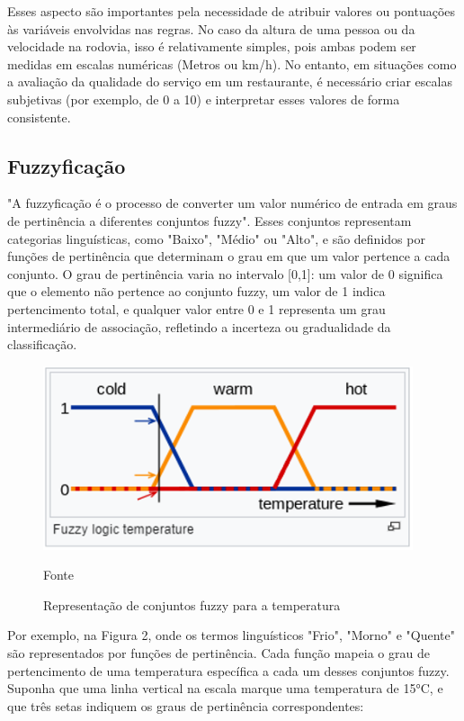 \documentclass[12pt]{article}
\begin{document}
Esses aspecto são importantes pela necessidade de atribuir valores ou pontuações às variáveis envolvidas nas regras. No caso da altura de uma pessoa ou da velocidade na rodovia, isso é relativamente simples, pois ambas podem ser medidas em escalas numéricas (Metros ou km/h). No entanto, em situações como a avaliação da qualidade do serviço em um restaurante, é necessário criar escalas subjetivas (por exemplo, de 0 a 10) e interpretar esses valores de forma consistente.

\subsection{Fuzzyficação}

"A fuzzyficação é o processo de converter um valor numérico de entrada em graus de pertinência a diferentes conjuntos fuzzy".\cite{youtubeFuzzy} Esses conjuntos representam categorias linguísticas, como "Baixo", "Médio" ou "Alto", e são definidos por funções de pertinência que determinam o grau em que um valor pertence a cada conjunto. O grau de pertinência varia no intervalo [0,1]: um valor de 0 significa que o elemento não pertence ao conjunto fuzzy, um valor de 1 indica pertencimento total, e qualquer valor entre 0 e 1 representa um grau intermediário de associação, refletindo a incerteza ou gradualidade da classificação. 

\newpage

\begin{figure}[ht]
\centering
\includegraphics[width=.7\textwidth]{FuzzyficaçãoTemp.png}
\caption{Representação de conjuntos fuzzy para a temperatura}
{\footnotesize Fonte \cite{ZiaeiComparative}}
\label{fig:fig2}
\end{figure}

Por exemplo, na Figura 2, onde os termos linguísticos "Frio", "Morno" e "Quente" são representados por funções de pertinência. Cada função mapeia o grau de pertencimento de uma temperatura específica a cada um desses conjuntos fuzzy. Suponha que uma linha vertical na escala marque uma temperatura de 15°C, e que três setas indiquem os graus de pertinência correspondentes:
\end{document}
